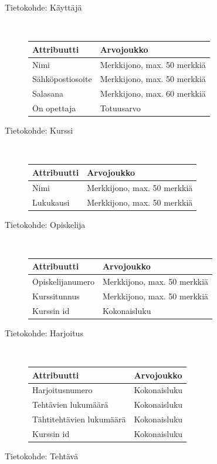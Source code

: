 \documentclass[a4paper,12pt, titlepage]{article}
\begin{document}
\begin{description}
	\item[Tietokohde: Käyttäjä] \hfill \\
	\begin{tabular}{| l | l |}
	\hline
	Attribuutti & Arvojoukko \\ \hline
	Nimi & Merkkijono, max. 50 merkkiä \\ \hline
	Sähköpostiosoite & Merkkijono, max. 50 merkkiä \\ \hline
	Salasana & Merkkijono, max. 60 merkkiä \\ \hline
	On opettaja & Totuusarvo \\ \hline
	\end{tabular}
	\item[Tietokohde: Kurssi] \hfill \\
	\begin{tabular}{| l | l |}
	\hline
	Attribuutti & Arvojoukko \\ \hline
	Nimi & Merkkijono, max. 50 merkkiä \\ \hline
	Lukukausi & Merkkijono, max. 50 merkkiä \\ \hline
	\end{tabular}
	\item[Tietokohde: Opiskelija] \hfill \\
	\begin{tabular}{| l | l |}
	\hline
	Attribuutti & Arvojoukko \\ \hline
	Opiskelijanumero & Merkkijono, max. 50 merkkiä \\ \hline
	Kurssitunnus & Merkkijono, max. 50 merkkiä \\ \hline
	Kurssin id & Kokonaisluku \\ \hline
	\end{tabular}
	\item[Tietokohde: Harjoitus] \hfill \\
	\begin{tabular}{| l | l |}
	\hline
	Attribuutti & Arvojoukko \\ \hline
	Harjoitusnumero & Kokonaisluku \\ \hline
	Tehtävien lukumäärä & Kokonaisluku \\ \hline
	Tähtitehtävien lukumäärä & Kokonaisluku \\ \hline
	Kurssin id & Kokonaisluku \\ \hline
	\end{tabular}
	\item[Tietokohde: Tehtävä] \hfill \\

\end{description}
\end{document}
